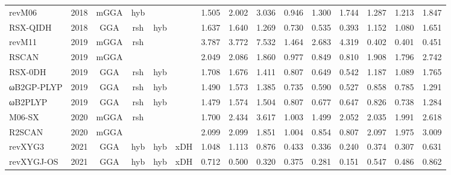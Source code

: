 \begin{landscape}
\begin{longtable}{lcccccrrrrrrrrr}
    revM06           & 2018 & mGGA & hyb      &             &           & 1.505             & 2.002             & 3.036  & 0.946              & 1.300             & 1.744  & 1.287   & 1.213 & 1.847 \\
    RSX-QIDH         & 2018 & GGA  & rsh      & hyb         &           & 1.637             & 1.640             & 1.269  & 0.730              & 0.535             & 0.393  & 1.152   & 1.080 & 1.651 \\
    revM11           & 2019 & mGGA & rsh      &             &           & 3.787             & 3.772             & 7.532  & 1.464              & 2.683             & 4.319  & 0.402   & 0.401 & 0.451 \\
    RSCAN            & 2019 & mGGA &          &             &           & 2.049             & 2.086             & 1.860  & 0.977              & 0.849             & 0.810  & 1.908   & 1.796 & 2.742 \\
    RSX-0DH          & 2019 & GGA  & rsh      & hyb         &           & 1.708             & 1.676             & 1.411  & 0.807              & 0.649             & 0.542  & 1.187   & 1.089 & 1.765 \\
    ωB2GP-PLYP       & 2019 & GGA  & rsh      & hyb         &           & 1.490             & 1.573             & 1.385  & 0.735              & 0.590             & 0.527  & 0.858   & 0.785 & 1.291 \\
    ωB2PLYP          & 2019 & GGA  & rsh      & hyb         &           & 1.479             & 1.574             & 1.504  & 0.807              & 0.677             & 0.647  & 0.826   & 0.738 & 1.284 \\
    M06-SX           & 2020 & mGGA & rsh      &             &           & 1.700             & 2.434             & 3.617  & 1.003              & 1.499             & 2.052  & 2.035   & 1.991 & 2.618 \\
    R2SCAN           & 2020 & mGGA &          &             &           & 2.099             & 2.099             & 1.851  & 1.004              & 0.854             & 0.807  & 2.097   & 1.975 & 3.009 \\
    revXYG3          & 2021 & GGA  & hyb      & hyb         & xDH       & 1.048             & 1.113             & 0.876  & 0.433              & 0.336             & 0.240  & 0.374   & 0.307 & 0.631 \\
    revXYGJ-OS       & 2021 & GGA  & hyb      & hyb         & xDH       & 0.712             & 0.500             & 0.320  & 0.375              & 0.281             & 0.151  & 0.547   & 0.486 & 0.862 \\

\end{longtable}
\end{landscape}
